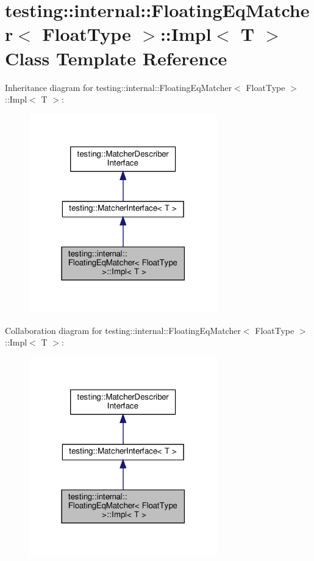 \hypertarget{classtesting_1_1internal_1_1_floating_eq_matcher_1_1_impl}{}\section{testing\+:\+:internal\+:\+:Floating\+Eq\+Matcher$<$ Float\+Type $>$\+:\+:Impl$<$ T $>$ Class Template Reference}
\label{classtesting_1_1internal_1_1_floating_eq_matcher_1_1_impl}


Inheritance diagram for testing\+:\+:internal\+:\+:Floating\+Eq\+Matcher$<$ Float\+Type $>$\+:\+:Impl$<$ T $>$\+:
\nopagebreak
\begin{figure}[H]
\begin{center}
\leavevmode
\includegraphics[width=231pt]{classtesting_1_1internal_1_1_floating_eq_matcher_1_1_impl__inherit__graph}
\end{center}
\end{figure}


Collaboration diagram for testing\+:\+:internal\+:\+:Floating\+Eq\+Matcher$<$ Float\+Type $>$\+:\+:Impl$<$ T $>$\+:
\nopagebreak
\begin{figure}[H]
\begin{center}
\leavevmode
\includegraphics[width=231pt]{classtesting_1_1internal_1_1_floating_eq_matcher_1_1_impl__coll__graph}
\end{center}
\end{figure}
